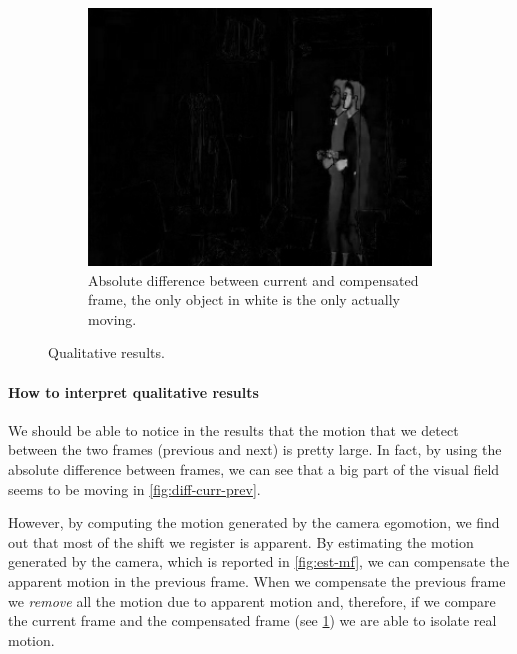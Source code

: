 \begin{figure}[!h]
    \hfill
    \begin{subfigure}[b]{0.3\textwidth}
        \includegraphics[width=1\textwidth]{../assets/images/04-diff-curr-comp.png}
        \caption{Absolute difference between current and compensated frame, the only object in white is the only actually moving.}
        \label{fig:diff-curr-comp}
    \end{subfigure}

    \caption{Qualitative results.}
    \label{fig:qualitative-results}
\end{figure}

\paragraph{How to interpret qualitative results} We should be able to notice in the results that the motion that we detect between the two frames (previous and next) is pretty large. In fact, by using the absolute difference between frames, we can see that a big part of the visual field seems to be moving in \cref{fig:diff-curr-prev}.

However, by computing the motion generated by the camera egomotion, we find out that most of the shift we register is apparent.
By estimating the motion generated by the camera, which is reported in  \cref{fig:est-mf}, we can compensate the apparent motion in the previous frame.
When we compensate the previous frame we \textit{remove} all the motion due to apparent motion and, therefore, if we compare the current frame and the compensated frame (see \cref{fig:diff-curr-comp}) we are able to isolate real motion.

